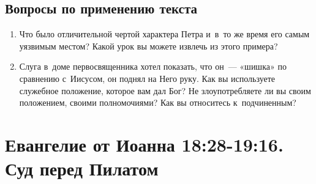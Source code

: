 \documentclass[a4paper,12pt]{article}
\begin{document}
\subsection*{Вопросы по применению текста} 
\begin{enumerate}
    \item Что было отличительной чертой характера Петра и~в~то же время его самым уязвимым местом? Какой урок вы можете извлечь из этого примера?
    
    \myline
    
    \myline
    \item Слуга в~доме первосвященника хотел показать, что он~--- «шишка» по сравнению с~Иисусом, он поднял на Него руку. Как вы используете служебное положение, которое вам дал Бог? Не злоупотребляете ли вы своим положением, своими полномочиями? Как вы относитесь к~подчиненным?
    
    \myline
    
    \myline
\end{enumerate}



\section{Евангелие от Иоанна 18:28-19:16. Суд перед Пилатом}
\end{document}
